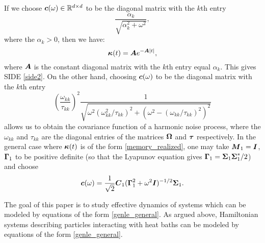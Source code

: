 \begin{example} If we  choose $\boldsymbol{c}(\omega) \in \mathbb{R}^{d \times d}$ to be the diagonal matrix with the $k$th entry 
\begin{equation}
\frac{\alpha_k}{\sqrt{\alpha^2_k+\omega^2}} ,\end{equation} 
where the $\alpha_{k} > 0$, then we have:
\begin{equation} \boldsymbol{\kappa}(t) = \boldsymbol{A} e^{-\boldsymbol{A}|t|}, \end{equation}
where $\boldsymbol{A}$ is the constant diagonal matrix with the $k$th entry equal $\alpha_{k}$. This gives SIDE \eqref{side2}.  On the other hand, choosing $\boldsymbol{c}(\omega)$ to be the diagonal matrix with the $k$th entry
\begin{equation}
\left(\frac{\omega_{kk}}{\tau_{kk}}\right)^2 \frac{1}{\sqrt{\omega^2 (\omega_{kk}^2/\tau_{kk})^2+(\omega^2-(\omega_{kk}/\tau_{kk})^2)^2}}\end{equation} allows us to obtain the covariance function of a harmonic noise process, where the $\omega_{kk}$ and $\tau_{kk}$ are the diagonal entries of the matrices $\boldsymbol{\Omega}$ and $\boldsymbol{\tau}$ respectively. In the general case where $\boldsymbol{\kappa}(t)$ is of the form \eqref{memory_realized}, one may take $\boldsymbol{M}_1 = \boldsymbol{I}$, $\boldsymbol{\Gamma}_1$ to be positive definite (so that the Lyapunov equation gives $\boldsymbol{\Gamma}_1 = \boldsymbol{\Sigma}_1 \boldsymbol{\Sigma}_1^*/2$) and choose 
\begin{equation}
\boldsymbol{c}(\omega) = \frac{1}{\sqrt{2}} \boldsymbol{C}_1 (\boldsymbol{\Gamma}^2_1 +  \omega^2 \boldsymbol{I})^{-1/2} \boldsymbol{\Sigma}_1.\\
\end{equation}
\end{example}

 The goal of this paper is to study effective dynamics of systems which  can be modeled by equations of the form \eqref{genle_general}. As argued above, Hamiltonian systems describing particles interacting with heat baths can be modeled by equations of the form \eqref{genle_general}. 



